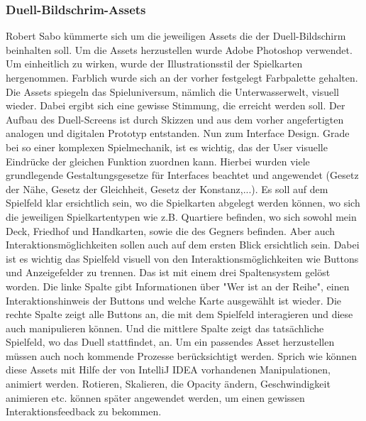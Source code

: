 \subsubsection{Duell-Bildschrim-Assets}
Robert Sabo kümmerte sich um die jeweiligen Assets die der Duell-Bildschirm beinhalten soll. Um die Assets herzustellen wurde Adobe Photoshop verwendet. Um einheitlich zu wirken, wurde der Illustrationsstil der Spielkarten hergenommen. Farblich wurde sich an der vorher festgelegt Farbpalette gehalten. Die Assets spiegeln das Spieluniversum, nämlich die Unterwasserwelt, visuell wieder. Dabei ergibt sich eine gewisse Stimmung, die erreicht werden soll. Der Aufbau des Duell-Screens ist durch Skizzen und aus dem vorher angefertigten analogen und digitalen Prototyp entstanden. 
Nun zum Interface Design. Grade bei so einer komplexen Spielmechanik, ist es wichtig, das der User visuelle Eindrücke der gleichen Funktion zuordnen kann. Hierbei wurden viele grundlegende Gestaltungsgesetze für Interfaces beachtet und angewendet (Gesetz der Nähe, Gesetz der Gleichheit, Gesetz der Konstanz,...). Es soll auf dem Spielfeld klar ersichtlich sein, wo die Spielkarten abgelegt werden können, wo sich die jeweiligen Spielkartentypen wie z.B. Quartiere befinden, wo sich sowohl mein Deck, Friedhof und Handkarten, sowie die des Gegners befinden. Aber auch Interaktionsmöglichkeiten sollen auch auf dem ersten Blick ersichtlich sein. Dabei ist es wichtig das Spielfeld visuell von den Interaktionsmöglichkeiten wie Buttons und Anzeigefelder zu trennen. Das ist mit einem drei Spaltensystem gelöst worden. Die linke Spalte gibt Informationen über "Wer ist an der Reihe", einen Interaktionshinweis der Buttons und welche Karte ausgewählt ist wieder. Die rechte Spalte zeigt alle Buttons an, die mit dem Spielfeld interagieren und diese auch manipulieren können. Und die mittlere Spalte zeigt das tatsächliche Spielfeld, wo das Duell stattfindet, an. Um ein passendes Asset herzustellen müssen auch noch kommende Prozesse berücksichtigt werden. Sprich wie können diese Assets mit Hilfe der von IntelliJ IDEA vorhandenen Manipulationen, animiert werden. Rotieren, Skalieren, die Opacity ändern, Geschwindigkeit animieren etc. können später angewendet werden, um einen gewissen Interaktionsfeedback zu bekommen.



